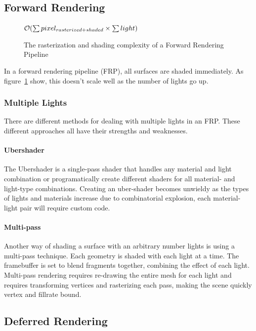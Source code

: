 \subsection{Forward Rendering}

\begin{figure}[H]
	\begin{math}
		\mathcal{O}(\sum {pixel_{rasterized + shaded}} \times \sum light)
	\end{math}
	\caption{The rasterization and shading complexity of a Forward Rendering Pipeline}
	\label{fig:FRP_complexity}
\end{figure}

In a forward rendering pipeline (FRP), all surfaces are shaded immediately. As figure~\ref{fig:FRP_complexity} show, this doesn't scale well as the number of lights go up.

\subsubsection{Multiple Lights}

There are different methods for dealing with multiple lights in an FRP. These different approaches all have their strengths and weaknesses.

\paragraph{Ubershader}

The Ubershader is a single-pass shader that handles any material and light combination or programatically create different shaders for all material- and light-type combinations. Creating an uber-shader becomes unwieldy as the types of lights and materials increase due to combinatorial explosion, each material-light pair will require custom code.

\paragraph{Multi-pass}

Another way of shading a surface with an arbitrary number lights is using a multi-pass technique. Each geometry is shaded with each light at a time. The framebuffer is set to blend fragments together, combining the effect of each light. Multi-pass rendering requires re-drawing the entire mesh for each light and requires transforming vertices and rasterizing each pass, making the scene quickly vertex and fillrate bound.

\subsection{Deferred Rendering}


